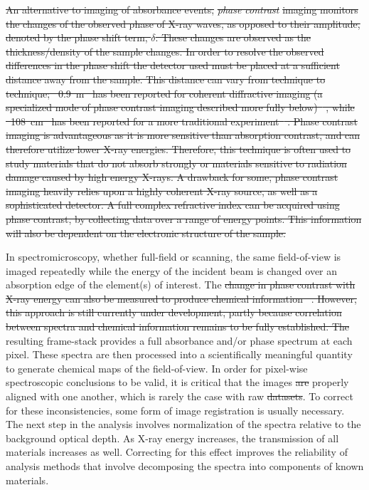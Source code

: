 \documentclass[journal=cmatex,manuscript=perspective]{achemso}
\providecommand{\DIFaddtex}[1]{{\protect\color{blue}\uwave{#1}}} %
\providecommand{\DIFdeltex}[1]{{\protect\color{red}\sout{#1}}}                      %
\providecommand{\DIFaddbegin}{} %
\providecommand{\DIFaddend}{} %
\providecommand{\DIFdelbegin}{} %
\providecommand{\DIFdelend}{} %
\providecommand{\DIFadd}[1]{\texorpdfstring{\DIFaddtex{#1}}{#1}} %
\providecommand{\DIFdel}[1]{\texorpdfstring{\DIFdeltex{#1}}{}} %
\begin{document}
\DIFdel{An alternative to imaging of absorbance events, }\emph{\DIFdel{phase contrast}}
\DIFdel{imaging monitors the changes of the observed phase of X-ray waves, as
opposed to their amplitude, denoted by the phase shift term,
$\delta$. These changes are observed as the thickness/density of the
sample changes. In order to resolve the observed differences in the
phase shift the detector used must be placed at a sufficient distance
away from the sample. This distance can vary from technique to
technique; \mbox{%
\SI{0.9}{m} }%
has been reported for coherent diffractive
imaging (a specialized mode of phase contrast imaging described more
fully below)\mbox{%
\cite{shpyrko2014}}%
, while \mbox{%
\SI{108}{cm} }%
has been reported
for a more traditional experiment\mbox{%
\cite{wen2014}}%
. Phase contrast
imaging is advantageous as it is more sensitive than absorption
contrast, and can therefore utilize lower X-ray energies. Therefore,
this technique is often used to study materials that do not absorb
strongly or materials sensitive to radiation damage caused by high
energy X-rays. A drawback for some, phase contrast imaging heavily
relies upon a highly coherent X-ray source, as well as a sophisticated
detector. A full complex refractive index can be acquired using phase
contrast, by collecting data over a range of energy points. This
information will also be dependent on the electronic structure of the
sample.
}%

\DIFdelend In spectromicroscopy, whether full-field or scanning, the same
field-of-view is imaged repeatedly while the energy of the incident
beam is changed over an absorption edge of the element(s) of
interest. The \DIFdelbegin \DIFdel{change in phase contrast with X-ray energy can also be
measured to produce chemical information\mbox{%
\cite{takahashi2011}}%
. However,
this approach is still currently under development, partly because
correlation between spectra and chemical information remains to be
fully established. The }\DIFdelend resulting frame-stack provides a full absorbance and/or
phase spectrum at each pixel. These spectra are then processed into a
scientifically meaningful quantity to generate chemical maps of the
field-of-view. In order for pixel-wise spectroscopic conclusions to be
valid, it is critical that the images \DIFdelbegin \DIFdel{are }\DIFdelend \DIFaddbegin \DIFadd{be }\DIFaddend properly aligned with one
another, which is rarely the case with raw \DIFdelbegin \DIFdel{datasets}\DIFdelend \DIFaddbegin \DIFadd{data-sets}\DIFaddend . To correct for
these inconsistencies, some form of image registration is usually
necessary. The next step in the analysis involves normalization of the
spectra relative to the background optical depth. As X-ray energy
increases, the transmission of all materials increases as
well. Correcting for this effect improves the reliability of analysis
methods that involve decomposing the spectra into components of known
materials\cite{jin2015}.
\DIFaddbegin 
\end{document}
